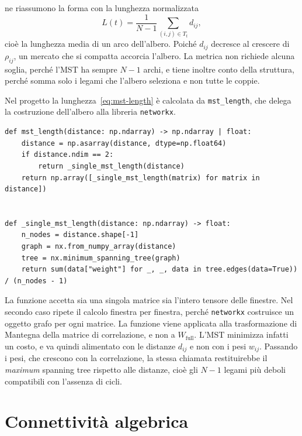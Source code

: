 \Textcite{onnela2003dynamics} ne riassumono la forma con la lunghezza normalizzata
\begin{equation}
\label{eq:mst-length}
L(t) = \frac{1}{N-1}\sum_{(i,j)\in T_t} d_{ij},
\end{equation}
cioè la lunghezza media di un arco dell'albero. Poiché $d_{ij}$ decresce al crescere di $\rho_{ij}$, un mercato che si compatta accorcia l'albero. La metrica non richiede alcuna soglia, perché l'MST ha sempre $N-1$ archi, e tiene inoltre conto della struttura, perché somma solo i legami che l'albero seleziona e non tutte le coppie.

Nel progetto la lunghezza~\eqref{eq:mst-length} è calcolata da \texttt{mst\_length}, che delega la costruzione dell'albero alla libreria \texttt{networkx}.

\begin{listing}[H]
\begin{verbatim}
def mst_length(distance: np.ndarray) -> np.ndarray | float:
    distance = np.asarray(distance, dtype=np.float64)
    if distance.ndim == 2:
        return _single_mst_length(distance)
    return np.array([_single_mst_length(matrix) for matrix in distance])


def _single_mst_length(distance: np.ndarray) -> float:
    n_nodes = distance.shape[-1]
    graph = nx.from_numpy_array(distance)
    tree = nx.minimum_spanning_tree(graph)
    return sum(data["weight"] for _, _, data in tree.edges(data=True)) / (n_nodes - 1)
\end{verbatim}
\caption{\texttt{mst\_length} e \texttt{\_single\_mst\_length}}
\label{lst:mst-length}
\end{listing}

La funzione accetta sia una singola matrice sia l'intero tensore delle finestre. Nel secondo caso ripete il calcolo finestra per finestra, perché \texttt{networkx} costruisce un oggetto grafo per ogni matrice. La funzione viene applicata alla trasformazione di Mantegna della matrice di correlazione, e non a $W_{\mathrm{full}}$. L'MST minimizza infatti un costo, e va quindi alimentato con le distanze $d_{ij}$ e non con i pesi $w_{ij}$. Passando i pesi, che crescono con la correlazione, la stessa chiamata restituirebbe il \emph{maximum} spanning tree rispetto alle distanze, cioè gli $N-1$ legami più deboli compatibili con l'assenza di cicli.

\section{Connettività algebrica}
\label{sec:topo-algebraic-connectivity}

